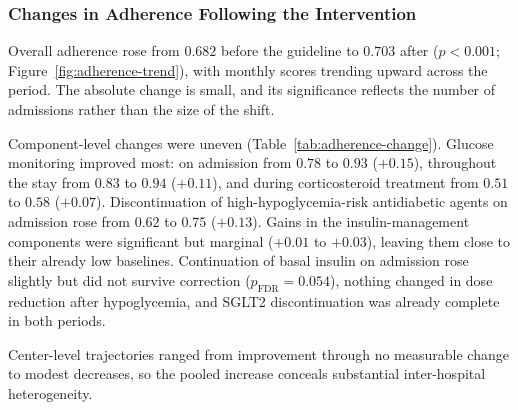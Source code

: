 \subsubsection{Changes in Adherence Following the Intervention}

Overall adherence rose from $0.682$ before the guideline to $0.703$ after
($p<0.001$; Figure~\ref{fig:adherence-trend}), with monthly scores trending
upward across the period. The absolute change is small, and its significance
reflects the number of admissions rather than the size of the shift.

Component-level changes were uneven (Table~\ref{tab:adherence-change}).
Glucose monitoring improved most: on admission from $0.78$ to $0.93$
($+0.15$), throughout the stay from $0.83$ to $0.94$ ($+0.11$), and during
corticosteroid treatment from $0.51$ to $0.58$ ($+0.07$). Discontinuation of
high-hypoglycemia-risk antidiabetic agents on admission rose from $0.62$ to
$0.75$ ($+0.13$). Gains in the insulin-management components were significant
but marginal ($+0.01$ to $+0.03$), leaving them close to their already low
baselines. Continuation of basal insulin on admission rose slightly but did
not survive correction ($p_{\mathrm{FDR}}=0.054$), nothing changed in dose
reduction after hypoglycemia, and SGLT2 discontinuation was already complete
in both periods.

Center-level trajectories ranged from improvement through no measurable
change to modest decreases, so the pooled increase conceals substantial
inter-hospital heterogeneity.

